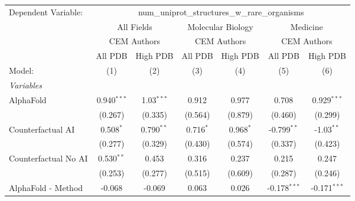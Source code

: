 \begingroup
\centering
\begin{tabular}{lcccccc}
   \tabularnewline \midrule \midrule
   Dependent Variable: & \multicolumn{6}{c}{num\_uniprot\_structures\_w\_rare\_organisms}\\
 & \multicolumn{2}{c}{All Fields} & \multicolumn{2}{c}{Molecular Biology} & \multicolumn{2}{c}{Medicine} \\
\cmidrule(lr){2-3} \cmidrule(lr){4-5} \cmidrule(lr){6-7}
 & \multicolumn{2}{c}{CEM Authors} & \multicolumn{2}{c}{CEM Authors} & \multicolumn{2}{c}{CEM Authors} \\
\cmidrule(lr){2-3} \cmidrule(lr){4-5} \cmidrule(lr){6-7}
 & \multicolumn{1}{c}{All PDB} & \multicolumn{1}{c}{High PDB} & \multicolumn{1}{c}{All PDB} & \multicolumn{1}{c}{High PDB} & \multicolumn{1}{c}{All PDB} & \multicolumn{1}{c}{High PDB} \\
\cmidrule(lr){2-2} \cmidrule(lr){3-3} \cmidrule(lr){4-4} \cmidrule(lr){5-5} \cmidrule(lr){6-6} \cmidrule(lr){7-7}
   Model:                                                     & (1)           & (2)           & (3)           & (4)           & (5)            & (6)\\  
   \midrule
   \emph{Variables}\\
   AlphaFold                                                  & 0.940$^{***}$ & 1.03$^{***}$  & 0.912         & 0.977         & 0.708          & 0.929$^{***}$\\   
                                                              & (0.267)       & (0.335)       & (0.564)       & (0.879)       & (0.460)        & (0.299)\\   
   Counterfactual AI                                          & 0.508$^{*}$   & 0.790$^{**}$  & 0.716$^{*}$   & 0.968$^{*}$   & -0.799$^{**}$  & -1.03$^{**}$\\   
                                                              & (0.277)       & (0.329)       & (0.430)       & (0.574)       & (0.337)        & (0.423)\\   
   Counterfactual No AI                                       & 0.530$^{**}$  & 0.453         & 0.316         & 0.237         & 0.215          & 0.247\\   
                                                              & (0.253)       & (0.277)       & (0.515)       & (0.609)       & (0.287)        & (0.246)\\   
   AlphaFold - Method                                         & -0.068        & -0.069        & 0.063         & 0.026         & -0.178$^{***}$ & -0.171$^{***}$\\   

\end{tabular}
